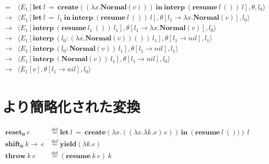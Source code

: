 \documentclass[a4j]{jsarticle}
\newcommand{\ra}{\rightarrow}
\newcommand{\app}[2]{\left(#1 \, #2\right)} %
\newcommand{\interpp}[2]{\mathbf{interp}~#1~#2}
\newcommand{\resume}[2]{\mathbf{resume}~ #1 ~#2}
\newcommand{\shift}[2]{\mathbf{shift_0}~ #1\ra ~#2}
\newcommand{\create}[1]{\mathbf{create}\left(#1\right)}
\newcommand{\letin}[3]{\mathbf{let}~#1~=~#2~\mathbf{in}~#3}
\newcommand{\yield}[1]{\mathbf{yield}\left(#1\right)}
\newcommand{\fun}[2]{\lambda #1. #2}
\newcommand{\throw}[2]{\mathbf{throw}~#1~#2}
\newcommand{\defeq}{\overset{\text{def}}=}
\newcommand{\reset}{\mathbf{reset_0}}
\newcommand{\Normal}{\mathbf{Normal}}
\begin{document}
\begin{align*}
  =& \langle E_1[\letin{l}
     {\create{(\lambda x.\Normal(v))}}
     {\interpp{(\resume{l}{()})}{l} }
     ],
     \theta, l_0\rangle \\
  \ra& \langle E_1[\letin{l}
       {l_1}
       {\interpp{(\resume{l}{()})}{l} }
       ],
       \theta[l_1\ra \lambda x.\Normal(v)], l_0\rangle \\
  \ra & \langle E_1[\interpp{(\resume{l_1}{()})}{l_1}], \theta[l_1\ra \lambda x.\Normal(v)], l_0\rangle \\
  \ra & \langle E_1[\interpp{(l_0: (\lambda x.\Normal(v)) ())}{l_1}], \theta[l_1\ra nil], l_1\rangle \\
  \ra & \langle E_1[\interpp{(l_0: \Normal(v))}{l_1}], \theta[l_1\ra nil], l_1\rangle \\
  \ra & \langle E_1[\interpp{(\Normal(v))}{l_1}], \theta[l_1\ra nil], l_0\rangle \\
  \ra & \langle E_1[v], \theta[l_1\ra nil], l_0\rangle \\
\end{align*}


\section{より簡略化された変換}
\begin{align*}
  \reset ~ e &\defeq \letin{l}
               {\create{ \fun{x}{\app{(\fun{x}{\fun{k}{x}})}}{e} } }
               {\left(\resume{l}{())}\right)
               ~l
               } \\
  \shift{k}{e} &\defeq \yield{\fun{k}{e}} \\
  \throw{k}{e} &\defeq (\resume{k}{e})~k \\
\end{align*}
\end{document}
